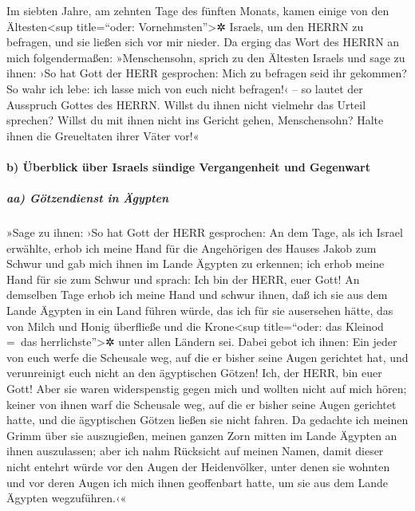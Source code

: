 Im siebten Jahre, am zehnten Tage des fünften Monats,
kamen einige von den Ältesten\textless sup title=``oder:
Vornehmsten''\textgreater✲ Israels, um den HERRN zu befragen, und sie
ließen sich vor mir nieder. Da erging das Wort des HERRN
an mich folgendermaßen: »Menschensohn, sprich zu den
Ältesten Israels und sage zu ihnen: ›So hat Gott der HERR gesprochen:
Mich zu befragen seid ihr gekommen? So wahr ich lebe: ich lasse mich von
euch nicht befragen!‹ -- so lautet der Ausspruch Gottes des HERRN.
Willst du ihnen nicht vielmehr das Urteil sprechen? Willst
du mit ihnen nicht ins Gericht gehen, Menschensohn? Halte ihnen die
Greueltaten ihrer Väter vor!«

\hypertarget{b-uxfcberblick-uxfcber-israels-suxfcndige-vergangenheit-und-gegenwart}{%
\paragraph{b) Überblick über Israels sündige Vergangenheit und
Gegenwart}\label{b-uxfcberblick-uxfcber-israels-suxfcndige-vergangenheit-und-gegenwart}}

\hypertarget{aa-guxf6tzendienst-in-uxe4gypten}{%
\subparagraph{aa) Götzendienst in
Ägypten}\label{aa-guxf6tzendienst-in-uxe4gypten}}

»Sage zu ihnen: ›So hat Gott der HERR gesprochen: An dem
Tage, als ich Israel erwählte, erhob ich meine Hand für die Angehörigen
des Hauses Jakob zum Schwur und gab mich ihnen im Lande Ägypten zu
erkennen; ich erhob meine Hand für sie zum Schwur und sprach: Ich bin
der HERR, euer Gott! An demselben Tage erhob ich meine
Hand und schwur ihnen, daß ich sie aus dem Lande Ägypten in ein Land
führen würde, das ich für sie ausersehen hätte, das von Milch und Honig
überfließe und die Krone\textless sup title=``oder: das Kleinod =~das
herrlichste''\textgreater✲ unter allen Ländern sei. Dabei
gebot ich ihnen: Ein jeder von euch werfe die Scheusale weg, auf die er
bisher seine Augen gerichtet hat, und verunreinigt euch nicht an den
ägyptischen Götzen! Ich, der HERR, bin euer Gott! Aber sie
waren widerspenstig gegen mich und wollten nicht auf mich hören; keiner
von ihnen warf die Scheusale weg, auf die er bisher seine Augen
gerichtet hatte, und die ägyptischen Götzen ließen sie nicht fahren. Da
gedachte ich meinen Grimm über sie auszugießen, meinen ganzen Zorn
mitten im Lande Ägypten an ihnen auszulassen; aber ich
nahm Rücksicht auf meinen Namen, damit dieser nicht entehrt würde vor
den Augen der Heidenvölker, unter denen sie wohnten und vor deren Augen
ich mich ihnen geoffenbart hatte, um sie aus dem Lande Ägypten
wegzuführen.‹«

